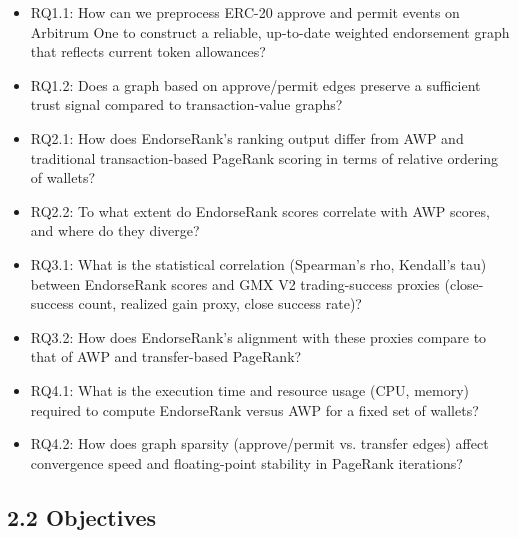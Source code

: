 
\begin{itemize}
\item[\textendash] RQ1.1: How can we preprocess ERC-20 approve and permit events on Arbitrum One to construct a reliable, up-to-date weighted endorsement graph that reflects current token allowances?
\item[\textendash] RQ1.2: Does a graph based on approve/permit edges preserve a sufficient trust signal compared to transaction-value graphs?
\end{itemize}

\begin{itemize}
\item[\textendash] RQ2.1: How does EndorseRank's ranking output differ from AWP and traditional transaction-based PageRank scoring in terms of relative ordering of wallets?
\item[\textendash] RQ2.2: To what extent do EndorseRank scores correlate with AWP scores, and where do they diverge?
\end{itemize}

\begin{itemize}
\item[\textendash] RQ3.1: What is the statistical correlation (Spearman's rho, Kendall's tau) between EndorseRank scores and GMX V2 trading-success proxies (close-success count, realized gain proxy, close success rate)?
\item[\textendash] RQ3.2: How does EndorseRank's alignment with these proxies compare to that of AWP and transfer-based PageRank?
\end{itemize}

\begin{itemize}
\item[\textendash] RQ4.1: What is the execution time and resource usage (CPU, memory) required to compute EndorseRank versus AWP for a fixed set of wallets?
\item[\textendash] RQ4.2: How does graph sparsity (approve/permit vs. transfer edges) affect convergence speed and floating-point stability in PageRank iterations?
\end{itemize}
\subsection*{2.2 Objectives}
\label{sec:objectives}

